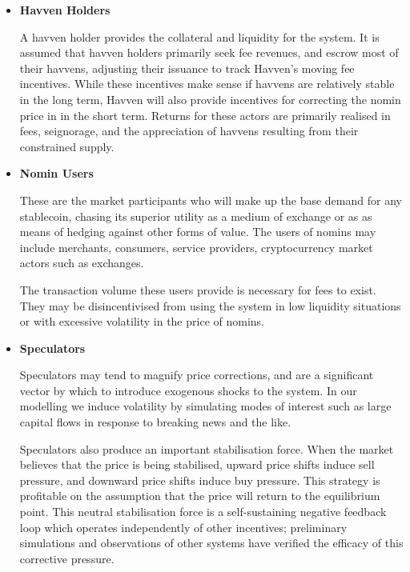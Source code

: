\begin{itemize}
	\item[] \textbf{Havven Holders}

	A havven holder provides the collateral and liquidity for the system.
	It is assumed that havven holders primarily seek fee revenues, and escrow most of their havvens,
	adjusting their issuance to track Havven's moving fee incentives.
	While these incentives make sense if havvens are relatively stable in the long term,
	Havven will also provide incentives for correcting the nomin price in in the short term.
	Returns for these actors are primarily realised in fees, seignorage, and the appreciation of havvens resulting
	from their constrained supply.

	\item[] \textbf{Nomin Users}

	These are the market participants who will make up the base demand
	for any stablecoin, chasing its superior utility as a medium of exchange or as
	as means of hedging against other forms of value. 
	The users of nomins may include merchants, consumers, service providers, cryptocurrency market actors
	such as exchanges. 
	
	The transaction volume these users provide is necessary for fees to exist.
	They may be disincentivised from using the system in low liquidity situations or with excessive volatility
	in the price of nomins.

	\item[] \textbf{Speculators}
	
	Speculators may tend to magnify price corrections, and are a significant vector by which to introduce
	exogenous shocks to the system. In our modelling we induce volatility by simulating modes of interest
	such as large capital flows in response to breaking news and the like.

	Speculators also produce an important stabilisation force. When the market believes that the price is
	being stabilised, upward price shifts induce sell pressure, and downward
	price shifts induce buy pressure. This strategy is profitable on the assumption that the price
	will return to the equilibrium point. This neutral stabilisation force is a self-sustaining
	negative feedback loop which operates independently of other incentives; preliminary simulations and observations of other systems
	have verified the efficacy of this corrective pressure.
	
	

\end{itemize}
